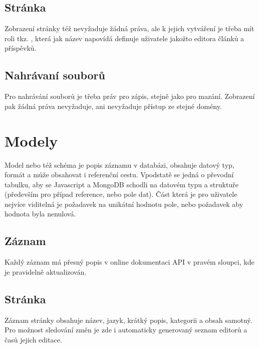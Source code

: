 \subsection{Stránka}
Zobrazení stránky též nevyžaduje žádná práva, ale k jejich vytváření je třeba mít roli tkz. , která
jak název napovídá definuje uživatele jakožto editora článků a příspěvků.
\subsection{Nahrávaní souborů}
Pro nahrávání souborů je třeba práv pro zápis, stejně jako pro mazání.
Zobrazení pak žádná práva nevyžaduje, ani nevyžaduje přístup ze stejné domény.

\section{Modely}
Model nebo též schéma je popis záznamu v databázi, obsahuje datový typ, formát a může obsahovat i
referenční cestu. Vpodstatě se jedná o převodní tabulku, aby se Javascript a MongoDB schodli na datovém typu a
struktuře (především pro případ reference, nebo pole dat). Část která je pro uživatele nejvíce viditelná je 
požadavek na unikátní hodnotu pole, nebo požadavek aby hodnota byla nenulová.
\subsection{Záznam} 
Každý záznam má přesný popis v online dokumentaci API v pravém sloupci, kde je pravidelně aktualizován.
\subsection{Stránka}
Záznam stránky obsahuje název, jazyk, krátký popis, kategorii a obsah samotný.
Pro možnost sledování změn je zde i automaticky generovaný seznam editorů a časů jejich editace.
